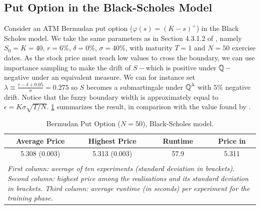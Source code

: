 \subsection{Put Option in the Black-Scholes Model} \label{sec:putBS}
Consider an ATM Bermudan put option ($\varphi(s) = (K-s)^+$) in the Black Scholes model. We take the same parameters as in  Section 4.3.1.2 of \cite{Becker2}, namely
$S_0=K=40$, $r = 6\%$, $\delta = 0\%$, $\sigma = 40\%$, with maturity $T=1$ and  $N=50$ exercise dates.  
As the stock price must reach low values to cross the boundary, we can use importance sampling to make the drift of $S-$which is positive under $\operatorname{\mathbb{Q}}-$negative under an equivalent measure. We can for instance set $\lambda \equiv \frac{r-\delta + 0.05}{\sigma}  = 0.275$ so $S$ becomes a submartingale under $\operatorname{\mathbb{Q}}^{\lambda}$ with $5\%$ negative drift. Notice that the fuzzy boundary width is approximately equal to $\epsilon = K\sigma \sqrt{T/N}$.  \cref{tab:resultPutBS} summarizes the result, in comparison with the value found by \citet{Becker1}.

\begin{table}[ht]
  \centering
  \caption{Bermudan Put Option ($N=50$), Black-Scholes model.  
 }
 
 \vspace{-2mm}
 
  \begin{tabular}{cccc}
 \hline \hline
    Average Price  & Highest Price & Runtime  & Price in \cite{Becker2}  \\
  \hline  \hline
  5.308 (0.003)  &  5.313 (0.003) &  57.9 & 5.311 \\
  \hline \\[-1em]
  
  \multicolumn{4}{l}{%
  \begin{minipage}{9.cm}%
    \tiny \textit{First  column:  average  of ten experiments (standard deviation in brackets). Second column: highest price  among the realisations and its standard deviation in brackets.  Third column:  average runtime (in seconds) per experiment for the training phase.}%
  \end{minipage}%
}

\end{tabular}
\vspace{2mm}
\label{tab:resultPutBS}
  \end{table}

